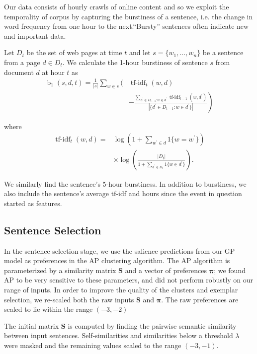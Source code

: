 \documentclass{sig-alternate}
\begin{document}
Our data consists of hourly crawls of online content and so we exploit the
temporality of corpus by capturing the burstiness of a sentence, i.e.  the
change in word frequency from one hour to the next.``Bursty'' sentences often
indicate new and important data. 

Let $D_t$ be the set of web pages at time $t$ and let $s = \{w_1,\ldots,
w_n\}$ be a sentence from a page $d \in D_t$.  We calculate the 1-hour
burstiness of sentence $s$ from document $d$ at hour $t$  as \begin{align*}
\operatorname{b}_1(s,d,t) = \frac{1}{|s|} \sum_{w \in s} \Bigg( &
\operatorname{tf-idf}_t(w,d)  \\ & \left. - \frac{\sum_{d^\prime \in D_{t-1}:
w \in d^\prime } \operatorname{tf-idf}_{t-1}(w,d^\prime)}{|\{d^\prime \in
D_{t-1}: w \in d^\prime\}|} \right) \end{align*}

where \begin{align*} \operatorname{tf-idf}_t(w,d) =&
\log\left(1+\sum_{w^\prime \in d}1\{w=w^\prime\}  \right)\\ & \times
\log\left(\frac{|D_t|}{1 + \sum_{d^\prime \in D_t}1\{w \in d^\prime\}}\right).
\end{align*}


We similarly find the sentence's 5-hour burstiness.  In addition to
burstiness, we also include the sentence's average tf-idf and hours since the
event in question started as features.


\subsection{Sentence Selection}\label{subsec:SentenceSelection}

In the sentence selection stage, we use the salience predictions from our GP
model as preferences in the AP clustering algorithm. The AP algorithm is 
parameterized by a similarity matrix $\mathbf{S}$ and a vector of 
preferences $\boldsymbol{\pi}$; we found AP to be very sensitive to these
parameters, and did not perform robustly on our range of inputs.
In order to improve the quality of the clusters and exemplar selection,
we re-scaled both the raw inputs $\mathbf{S}$ and $\boldsymbol{\pi}$. 
The raw preferences are scaled to lie within the  range $(-3, -2)$

The initial matrix $\mathbf{S}$ is computed by finding the pairwise semantic
similarity between input sentences. Self-similarities and similarities below 
a threshold $\lambda$ were masked and the remaining values scaled to the range
$(-3, -1)$.
\end{document}
